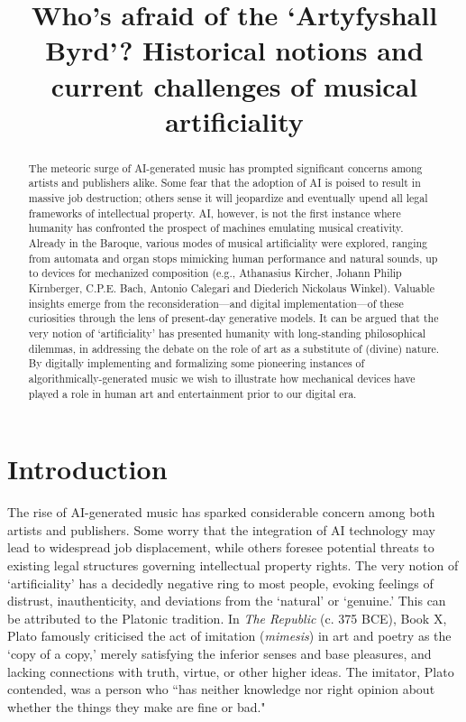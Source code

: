 \documentclass{article}
\title{Who's afraid of the `Artyfyshall Byrd'? Historical notions and current challenges of musical artificiality}
\begin{document}
%
\maketitle
%
\begin{abstract}
The meteoric surge of AI-generated music has prompted significant concerns among artists and publishers alike. Some fear that the adoption of AI is poised to result in massive job destruction; others sense it will jeopardize and eventually upend all legal frameworks of intellectual property. AI, however, is not the first instance where humanity has confronted the prospect of machines emulating musical creativity. Already in the Baroque, various modes of musical artificiality were explored, ranging from automata and organ stops mimicking human performance and natural sounds, up to devices for mechanized composition (e.g., Athanasius Kircher, Johann Philip Kirnberger, C.P.E. Bach, Antonio Calegari and Diederich Nickolaus Winkel). 
Valuable insights emerge from the reconsideration—and digital implementation—of these curiosities through the lens of present-day generative models. It can be argued that the very notion of ‘artificiality’ has presented humanity with long-standing philosophical dilemmas, in addressing the debate on the role of art as a substitute of (divine) nature. By digitally implementing and formalizing some pioneering instances of  algorithmically-generated music we wish to illustrate how mechanical devices have played a role in human art and entertainment prior to our digital era. 

\end{abstract}
%
\section{Introduction}\label{sec:introduction}

The rise of AI-generated music has sparked considerable concern among both artists and publishers. Some worry that the integration of AI technology may lead to widespread job displacement, while others foresee potential threats to existing legal structures governing intellectual property rights. The very notion of ‘artificiality’ has a decidedly negative ring to most people, evoking feelings of distrust, inauthenticity, and deviations from the ‘natural’ or ‘genuine.’ This can be attributed to the Platonic tradition. In \textit{The Republic} (c. 375 BCE), Book X, Plato famously criticised the act of imitation (\textit{mimesis}) in art and poetry as the ‘copy of a copy,’ merely satisfying the inferior senses and base pleasures, and lacking connections with truth, virtue, or other higher ideas. The imitator, Plato contended, was a person who “has neither knowledge nor right opinion about whether the things they make are fine or bad." \cite[p. 1206]{cooper1997plato}
\end{document}
